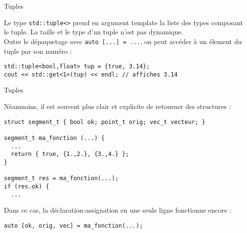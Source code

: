 \documentclass[c]{beamer}
\newcommand{\inline}[1]{\texttt{#1}}
\begin{document}

\begin{frame}[fragile]{Tuples}

Le type \inline{std::tuple<>} prend en argument template la liste des types composant le tuple. La taille et le type d'un tuple n'est pas dynamique.\\

Outre le dépaquetage avec \inline{auto [...] = ...}, on peut accéder à un élement du tuple par son numéro :
\begin{verbatim}
std::tuple<bool,float> tup = {true, 3.14};
cout << std::get<1>(tup) << endl; // affiches 3.14
\end{verbatim}

\end{frame}


\begin{frame}[fragile]{Tuples}

Néanmoins, il est souvent plus clair et explicite de retourner des structures :
\begin{verbatim}
struct segment_t { bool ok; point_t orig; vec_t vecteur; }

segment_t ma_fonction (...) {
  ...
  return { true, {1.,2.}, {3.,4.} };
}

segment_t res = ma_fonction(...);
if (res.ok) {
  ...
\end{verbatim}

Dans ce cas, la déclaration-assignation en une seule ligne fonctionne encore :
\begin{verbatim}
auto [ok, orig, vec] = ma_fonction(...);
\end{verbatim}

\end{frame}
\end{document}
